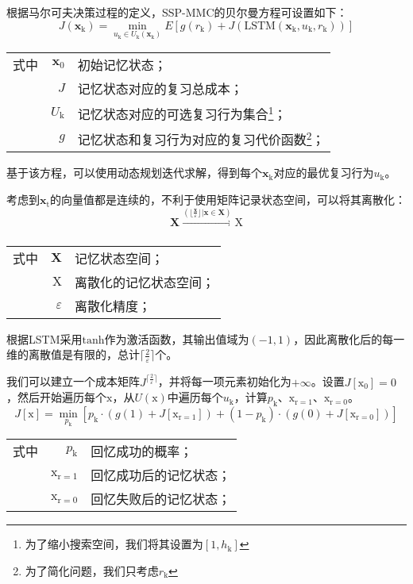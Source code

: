 根据马尔可夫决策过程的定义，SSP-MMC的贝尔曼方程可设置如下：
\begin{equation}
J(\bm x_\mathrm{k}) = \min\limits_{u_\mathrm{k} \in U_\mathrm{k}(\bm x_\mathrm{k})} E[g(r_\mathrm{k}) + J(\mathrm{LSTM}(\bm x_\mathrm{k},u_\mathrm{k},r_\mathrm{k}))]
\end{equation}
\begin{tabularx}{\textwidth}{@{}l@{\quad}r@{———}X@{}}
    式中&  $\bm x_0$ &初始记忆状态；\\
    & $J$ &记忆状态对应的复习总成本；\\
    & $U_\mathrm{k}$ &记忆状态对应的可选复习行为集合\footnote{为了缩小搜索空间，我们将其设置为$[1,h_\mathrm{k}]$}；\\
    & $g$ &记忆状态和复习行为对应的复习代价函数\footnote{为了简化问题，我们只考虑$r_\mathrm{k}$}；
\end{tabularx}\vspace{3.15bp}

基于该方程，可以使用动态规划迭代求解，得到每个$\bm x_\mathrm{k}$对应的最优复习行为$u_\mathrm{k}$。

考虑到$\bm x_\mathrm{t}$的向量值都是连续的，不利于使用矩阵记录状态空间，可以将其离散化：
\begin{equation}
\bm X \xrightarrow[]{(\lfloor \frac{\bm x}{\varepsilon} \rfloor|\bm x \in \bm X)} \bm{\mathrm{X}}
\end{equation}
\begin{tabularx}{\textwidth}{@{}l@{\quad}r@{———}X@{}}
    式中& $\bm X$ &记忆状态空间；\\
    & $\bm{\mathrm{X}}$ &离散化的记忆状态空间；\\
    &  $\varepsilon$ &离散化精度；
\end{tabularx}\vspace{3.15bp}

根据LSTM采用$\mathrm{tanh}$作为激活函数，其输出值域为$(-1,1)$，因此离散化后的每一维的离散值是有限的，总计$\lceil\frac{2}{\varepsilon}\rceil$个。

我们可以建立一个成本矩阵$J^{\lceil\frac{2}{\varepsilon}\rceil}$，并将每一项元素初始化为$+\infty$。设置$J[\bm{\mathrm{x_0}}] = 0$，然后开始遍历每个$\bm{\mathrm{x}}$，从$U(\bm{\mathrm{x}})$中遍历每个$u_\mathrm{k}$，计算$p_\mathrm{k}$、$\bm{\mathrm{x}}_\mathrm{r=1}$、$\bm{\mathrm{x}}_\mathrm{r=0}$。
\begin{equation}
\label{eqn:ssp-mmc}
J[\bm{\mathrm{x}}] = \min\limits_{p_\mathrm{k}} [p_\mathrm{k} \cdot (g(1) + J[\bm{\mathrm{x}}_\mathrm{r=1}]) + (1-p_\mathrm{k}) \cdot (g(0) + J[\bm{\mathrm{x}}_\mathrm{r=0}])]
\end{equation}
\begin{tabularx}{\textwidth}{@{}l@{\quad}r@{———}X@{}}
    式中&  $p_\mathrm{k}$ &回忆成功的概率；\\
    &  $\bm{\mathrm{x}}_\mathrm{r=1}$ &回忆成功后的记忆状态；\\
    &  $\bm{\mathrm{x}}_\mathrm{r=0}$ &回忆失败后的记忆状态；
\end{tabularx}\vspace{3.15bp}

